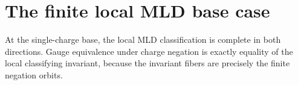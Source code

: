 \section{The finite local MLD base case}

\begin{theorem}\label{thm:bilattice-base-mld}\leanok{}
At the single-charge base, the local MLD classification is complete in both
directions. Gauge equivalence under charge negation is exactly equality of
the local classifying invariant, because the invariant fibers are precisely
the finite negation orbits.
\end{theorem}
